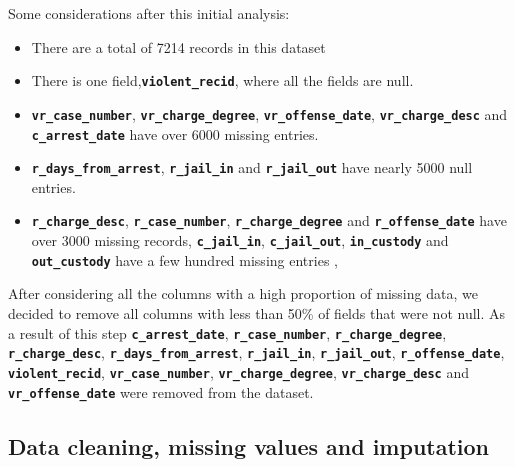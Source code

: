 \documentclass[conference]{IEEEtran}
\begin{document}
	Some considerations after this initial analysis:

	\begin{flushleft}	
	\begin{itemize}
		\item There are a total of 7214 records in this dataset
		
		\item There is one field,\textbf{\texttt{violent\_recid}}, where all the fields are null.
	
		\item \textbf{\texttt{vr\_case\_number}}, \textbf{\texttt{vr\_charge\_degree}}, \textbf{\texttt{vr\_offense\_date}}, \textbf{\texttt{vr\_charge\_desc}} and \textbf{\texttt{c\_arrest\_date}}  have over 6000 missing entries.
		
		\item \textbf{\texttt{r\_days\_from\_arrest}}, \textbf{\texttt{r\_jail\_in}} and \textbf{\texttt{r\_jail\_out}} have nearly 5000 null entries.
		
		\item \textbf{\texttt{r\_charge\_desc}}, \textbf{\texttt{r\_case\_number}}, \textbf{\texttt{r\_charge\_degree}} and \textbf{\texttt{r\_offense\_date}} have over 3000 missing records, \textbf{\texttt{c\_jail\_in}}, \textbf{\texttt{c\_jail\_out}}, \textbf{\texttt{in\_custody}} and \textbf{\texttt{out\_custody}} have a few hundred missing entries , 
	\end{itemize}
	\end{flushleft}
	
	\begin{flushleft}
	After considering all the columns with a high proportion of missing data, we decided to remove all columns with less than 50\% of fields that were not null. As a result of this step \textbf{\texttt{c\_arrest\_date}}, \textbf{\texttt{r\_case\_number}}, \textbf{\texttt{r\_charge\_degree}}, \textbf{\texttt{r\_charge\_desc}}, \textbf{\texttt{r\_days\_from\_arrest}}, \textbf{\texttt{r\_jail\_in}}, \textbf{\texttt{r\_jail\_out}}, \textbf{\texttt{r\_offense\_date}}, \textbf{\texttt{violent\_recid}}, \textbf{\texttt{vr\_case\_number}}, \textbf{\texttt{vr\_charge\_degree}}, \textbf{\texttt{vr\_charge\_desc}} and \textbf{\texttt{vr\_offense\_date}} were removed from the dataset.
	\end{flushleft}
	
	\subsection{Data cleaning, missing values and imputation}
	
\end{document}
